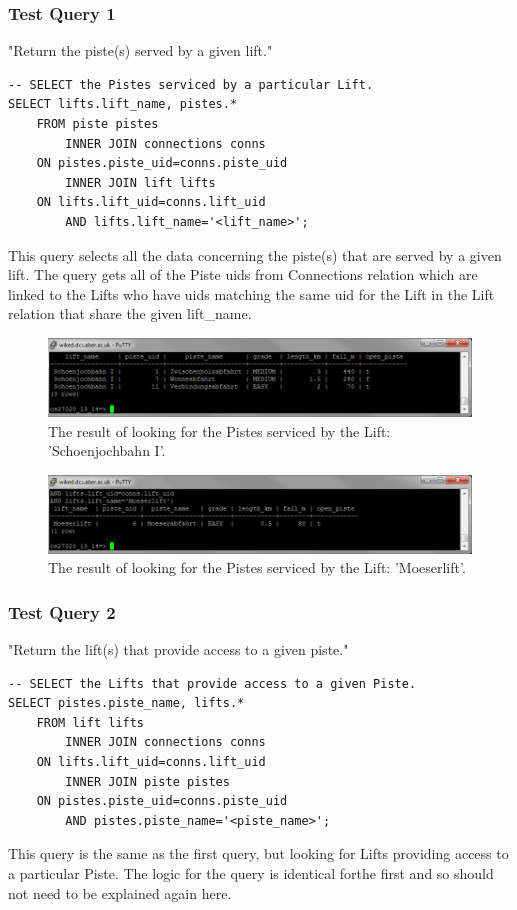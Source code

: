 \documentclass[11pt]{scrartcl} %
\begin{document}
\subsubsection{Test Query 1}
"Return the piste(s) served by a given lift."
\begin{lstlisting}
-- SELECT the Pistes serviced by a particular Lift.
SELECT lifts.lift_name, pistes.*
	FROM piste pistes
		INNER JOIN connections conns
	ON pistes.piste_uid=conns.piste_uid
		INNER JOIN lift lifts
	ON lifts.lift_uid=conns.lift_uid
		AND lifts.lift_name='<lift_name>';
\end{lstlisting}
This query selects all the data concerning the piste(s) that are served by a given lift. The query gets all of the Piste uids from Connections relation which are linked to the Lifts who have uids matching the same uid for the Lift in the Lift relation that share the given lift\_name.

\begin{figure}[H]
  \centering
    \includegraphics[width=1\textwidth]{IMG/query_1_1.png}
 \caption{The result of looking for the Pistes serviced by the Lift: 'Schoenjochbahn I'.}
\end{figure}

\begin{figure}[H]
  \centering
    \includegraphics[width=1\textwidth]{IMG/query_1_2.png}
 \caption{The result of looking for the Pistes serviced by the Lift: 'Moeserlift'.}
\end{figure}

\subsubsection{Test Query 2}
"Return the lift(s) that provide access to a given piste."
\begin{lstlisting}
-- SELECT the Lifts that provide access to a given Piste.
SELECT pistes.piste_name, lifts.*
	FROM lift lifts
		INNER JOIN connections conns
	ON lifts.lift_uid=conns.lift_uid
		INNER JOIN piste pistes
	ON pistes.piste_uid=conns.piste_uid
		AND pistes.piste_name='<piste_name>';
\end{lstlisting}
This query is the same as the first query, but looking for Lifts providing access to a particular Piste. The logic for the query is identical forthe first and so should not need to be explained again here.
\end{document}
